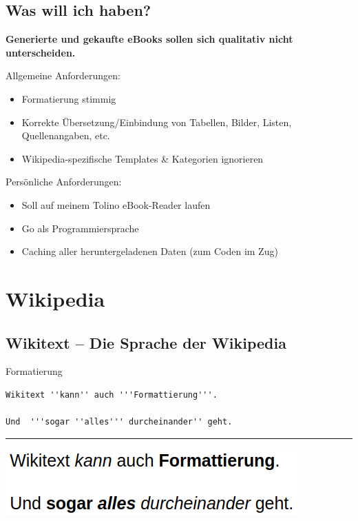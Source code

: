 \documentclass{beamer}
\begin{document}
	\subsection{Was will ich haben?}
	\begin{frame}
		\begin{center}
			\textbf{Generierte und gekaufte eBooks sollen sich qualitativ nicht unterscheiden.}
		\end{center}\pause
		Allgemeine Anforderungen:
		\begin{itemize}
			\item Formatierung stimmig
			\item Korrekte Übersetzung/Einbindung von Tabellen, Bilder, Listen, Quellenangaben, etc.
			\item Wikipedia-spezifische Templates \& Kategorien ignorieren
		\end{itemize}\pause\n
		Persönliche Anforderungen:
		\begin{itemize}
			\item Soll auf meinem Tolino eBook-Reader laufen
			\item Go als Programmiersprache
			\item Caching aller heruntergeladenen Daten (zum Coden im Zug)
		\end{itemize}
	\end{frame}

	\section{Wikipedia}	
	
	\subsection{Wikitext -- Die Sprache der Wikipedia}
	
	\begin{frame}[fragile]{Formatierung}
		\begin{verbatim}
Wikitext ''kann'' auch '''Formattierung'''.

Und  '''sogar ''alles''' durcheinander'' geht.
		\end{verbatim}
		\hrule\n
		\includegraphics[scale=0.35]{images/wikitext-example-0-formatting.png}
	\end{frame}
	
\end{document}
